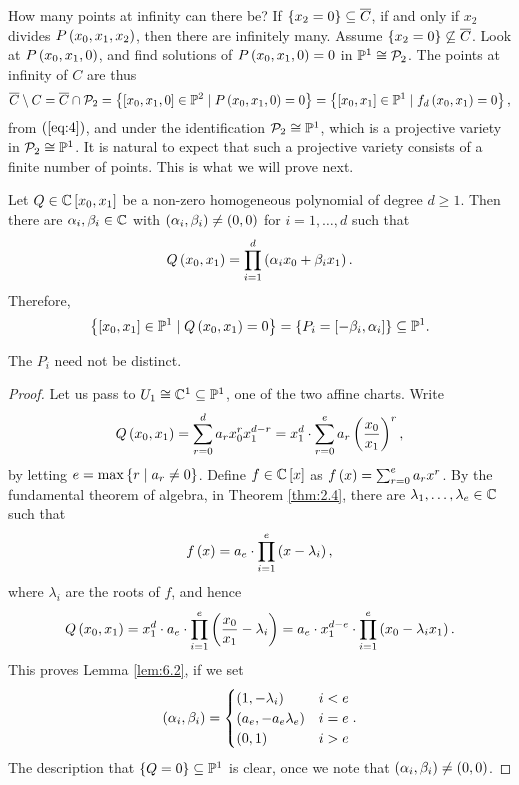 How many points at infinity can there be? If $ \left\{ x_2 = 0 \right\} \subseteq \overline{C} $, if and only if $ x_2 $ divides $ P\left( x_0, x_1, x_2 \right) $, then there are infinitely many. Assume $ \left\{ x_2 = 0 \right\} \not\subseteq \overline{C} $. Look at $ P\left( x_0, x_1, 0 \right) $, and find solutions of $ P\left( x_0, x_1, 0 \right) = 0 $ in $ \mathbb{P}^1 \cong \mathcal{P}_2 $. The points at infinity of $ C $ are thus
$$ \overline{C} \setminus C = \overline{C} \cap \mathcal{P}_2 = \left\{ \left[ x_0, x_1, 0 \right] \in \mathbb{P}^2 \mid P\left( x_0, x_1, 0 \right) = 0 \right\} = \left\{ \left[ x_0, x_1 \right] \in \mathbb{P}^1 \mid f_d\left( x_0, x_1 \right) = 0 \right\}, $$
from $ \left( \ref{eq:4} \right) $, and under the identification $ \mathcal{P}_2 \cong \mathbb{P}^1 $, which is a projective variety in $ \mathcal{P}_2 \cong \mathbb{P}^1 $. It is natural to expect that such a projective variety consists of a finite number of points. This is what we will prove next.

\begin{lemma}
\label{lem:6.2}
Let $ Q \in \mathbb{C}\left[ x_0, x_1 \right] $ be a non-zero homogeneous polynomial of degree $ d \ge 1 $. Then there are $ \alpha_i, \beta_i \in \mathbb{C} $ with $ \left( \alpha_i, \beta_i \right) \ne \left( 0, 0 \right) $ for $ i = 1, \dots, d $ such that
$$ Q\left( x_0, x_1 \right) = \prod_{i = 1}^d \left( \alpha_ix_0 + \beta_ix_1 \right). $$
Therefore,
$$ \left\{ \left[ x_0, x_1 \right] \in \mathbb{P}^1 \mid Q\left( x_0, x_1 \right) = 0 \right\} = \left\{ P_i = \left[ -\beta_i, \alpha_i \right] \right\} \subseteq \mathbb{P}^1. $$
\end{lemma}

\begin{note*}
The $ P_i $ need not be distinct.
\end{note*}

\begin{proof}
Let us pass to $ U_1 \cong \mathbb{C}^1 \subseteq \mathbb{P}^1 $, one of the two affine charts. Write
$$ Q\left( x_0, x_1 \right) = \sum_{r = 0}^d a_rx_0^rx_1^{d - r} = x_1^d \cdot \sum_{r = 0}^e a_r\left( \dfrac{x_0}{x_1} \right)^r, $$
by letting $ e = \max\left\{ r \mid a_r \ne 0 \right\} $. Define $ f \in \mathbb{C}\left[ x \right] $ as $ f\left( x \right) = \sum_{r = 0}^e a_rx^r $. By the fundamental theorem of algebra, in Theorem \ref{thm:2.4}, there are $ \lambda_1, \dots, \lambda_e \in \mathbb{C} $ such that
$$ f\left( x \right) = a_e \cdot \prod_{i = 1}^e \left( x - \lambda_i \right), $$
where $ \lambda_i $ are the roots of $ f $, and hence
$$ Q\left( x_0, x_1 \right) = x_1^d \cdot a_e \cdot \prod_{i = 1}^e \left( \dfrac{x_0}{x_1} - \lambda_i \right) = a_e \cdot x_1^{d - e} \cdot \prod_{i = 1}^e \left( x_0 - \lambda_ix_1 \right). $$
This proves Lemma \ref{lem:6.2}, if we set
$$ \left( \alpha_i, \beta_i \right) =
\begin{cases}
\left( 1, -\lambda_i \right) & i < e \\
\left( a_e, -a_e\lambda_e \right) & i = e \\
\left( 0, 1 \right) & i > e
\end{cases}.
$$
The description that $ \left\{ Q = 0 \right\} \subseteq \mathbb{P}^1 $ is clear, once we note that $ \left( \alpha_i, \beta_i \right) \ne \left( 0, 0 \right) $.
\end{proof}


